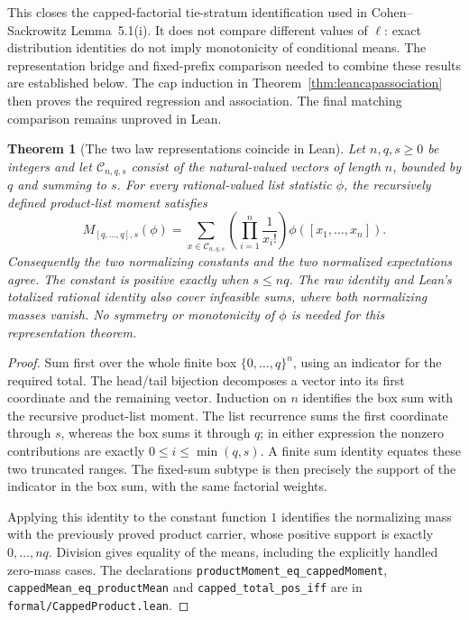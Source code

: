 \documentclass[11pt]{article}
\newtheorem{theorem}{Theorem}
\begin{document}
This closes the capped-factorial tie-stratum identification used in
Cohen--Sackrowitz Lemma~5.1(i). It does not compare different values of
$\ell$: exact distribution identities do not imply monotonicity of
conditional means. The representation bridge and fixed-prefix comparison needed to
combine these results are established below. The cap induction in
Theorem~\ref{thm:leancapassociation} then proves the required regression
and association. The final matching comparison remains unproved in Lean.

\begin{theorem}[The two law representations coincide in Lean]\label{thm:leanrepresentation}
Let $n,q,s\geq0$ be integers and let $\mathcal C_{n,q,s}$ consist of the
natural-valued vectors of length $n$, bounded by $q$ and summing to $s$.
For every rational-valued list statistic $\phi$, the recursively defined
product-list moment satisfies
\[
 M_{[q,\ldots,q],s}(\phi)
 =\sum_{x\in\mathcal C_{n,q,s}}
   \left(\prod_{i=1}^{n}\frac1{x_i!}\right)
   \phi([x_1,\ldots,x_n]).
\]
Consequently the two normalizing constants and the two normalized
expectations agree. The constant is positive exactly when $s\leq nq$.
The raw identity and Lean's totalized rational identity also cover
infeasible sums, where both normalizing masses vanish. No symmetry or
monotonicity of $\phi$ is needed for this representation theorem.
\end{theorem}
\begin{proof}
Sum first over the whole finite box $\{0,\ldots,q\}^n$, using an indicator
for the required total. The head/tail bijection decomposes a vector
into its first coordinate and the remaining vector. Induction on $n$
identifies the box sum with the recursive product-list moment. The
list recurrence sums the first coordinate through $s$, whereas the box
sums it through $q$; in either expression the nonzero contributions are
exactly $0\leq i\leq\min(q,s)$. A finite sum identity equates these two
truncated ranges. The fixed-sum subtype is then precisely the support
of the indicator in the box sum, with the same factorial weights.

Applying this identity to the constant function $1$ identifies the
normalizing mass with the previously proved product carrier, whose
positive support is exactly $0,\ldots,nq$. Division gives equality of
the means, including the explicitly handled zero-mass cases.
The declarations \texttt{productMoment\_eq\_cappedMoment},
\texttt{cappedMean\_eq\_productMean} and
\texttt{capped\_total\_pos\_iff} are in
\texttt{formal/CappedProduct.lean}.
\end{proof}
\end{document}
